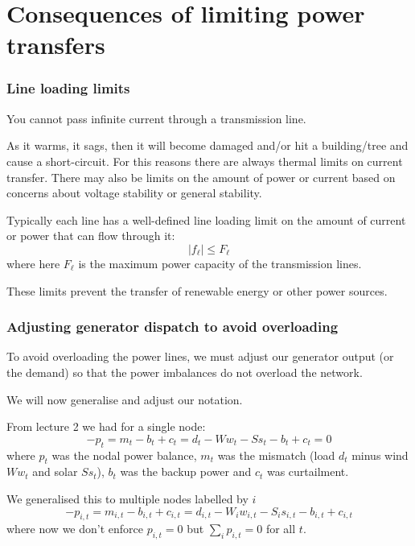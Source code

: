 \documentclass[10pt,dvipsnames]{beamer}
\begin{document}
\section{Consequences of limiting power transfers}



\begin{frame}
  \frametitle{Line loading limits}

  You cannot pass infinite current through a transmission line.

  As it warms, it sags, then it will become damaged and/or hit a
  building/tree and cause a short-circuit. For this reasons there are
  always \alert{thermal limits} on current transfer. There may also be
  limits on the amount of power or current based on concerns about
  \alert{voltage stability} or \alert{general stability}.

  Typically each line has a well-defined \alert{line loading limit} on the
  amount of current or power that can flow through it:
  \begin{equation*}
    | f_{\ell } | \leq F_\ell
  \end{equation*}
  where here $F_\ell$ is the maximum power capacity of the transmission lines.

  These limits prevent the transfer of renewable energy or other power sources.

\end{frame}




\begin{frame}
  \frametitle{Adjusting generator dispatch to avoid overloading}

  To avoid overloading the power lines, we must adjust our generator
  output (or the demand) so that the power imbalances do not overload
  the network.

  We will now generalise and adjust our notation.

  From lecture 2 we had for a single node:
  \begin{equation*}
    - p_t = m_t -b_t + c_t = d_t - Ww_t - Ss_t -b_t + c_t = 0
  \end{equation*}
  where $p_t$ was the nodal power balance, $m_t$ was the mismatch
  (load $d_t$ minus wind $Ww_t$ and solar $Ss_t$), $b_t$ was the
  backup power and $c_t$ was curtailment.

  We generalised this to multiple nodes labelled by $i$
  \begin{equation*}
    - p_{i,t} = m_{i,t} -b_{i,t} + c_{i,t} = d_{i,t} - W_iw_{i,t} - S_is_{i,t} -b_{i,t} + c_{i,t}
  \end{equation*}
  where now we don't enforce $p_{i,t} = 0$ but $\sum_{i} p_{i,t} = 0$ for
  all $t$.

\end{frame}
\end{document}
